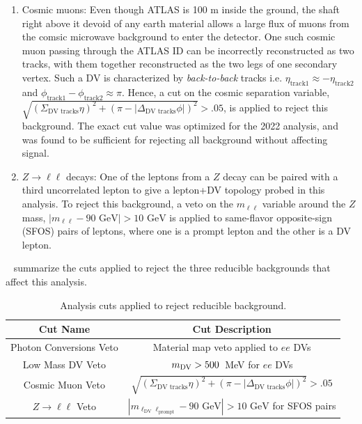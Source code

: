 \begin{enumerate}
    \item Cosmic muons: Even though ATLAS is 100 m inside the ground, the shaft right above it devoid of any earth material allows a large flux of muons from the comsic microwave background to enter the detector. One such cosmic muon passing through the ATLAS ID can be incorrectly reconstructed as two tracks, with them together reconstructed as the two legs of one secondary vertex. Such a DV is characterized by \textit{back-to-back} tracks i.e. $\eta_\mathrm{track1}\approx-\eta_\mathrm{track2}$ and $\phi_\mathrm{track1}-\phi_\mathrm{track2}\approx\pi$. Hence, a cut on the cosmic separation variable, $\sqrt{(\Sigma_\text{DV tracks}\eta)^2+(\pi-|\Delta_\text{DV tracks}\phi|)^2}>.05$, is applied to reject this background. The exact cut value was optimized for the 2022 analysis, and was found to be sufficient for rejecting all background without affecting signal.

    \item $Z\to\ell\ell$ decays: One of the leptons from a $Z$ decay can be paired with a third uncorrelated lepton to give a lepton+DV topology probed in this analysis. To reject this background, a veto on the $m_{\ell\ell}$ variable around the $Z$ mass, $|m_{\ell\ell}-90\text{ GeV}|>10\text{ GeV}$ is applied to same-flavor opposite-sign (SFOS) pairs of leptons, where one is a prompt lepton and the other is a DV lepton.
\end{enumerate}

~ summarize the cuts applied to reject the three reducible backgrounds that affect this analysis.

\begin{table}[!ht]
    \centering
    \begin{tabular}{cc}
        \hline\hline
         Cut Name & Cut Description\\
         \hline
         Photon Conversions Veto & Material map veto applied to $ee$ DVs\\
         Low Mass DV Veto & $m_{\mathrm{DV}}>500$~MeV for $ee$ DVs\\
         Cosmic Muon Veto & $\sqrt{(\Sigma_\text{DV tracks}\eta)^2+(\pi-|\Delta_\text{DV tracks}\phi|)^2}>.05$\\
         $Z\to\ell\ell$ Veto & $|m_{\ell_\mathrm{DV}\ell_\mathrm{prompt}}-90\text{ GeV}|>10\text{ GeV}$ for SFOS pairs \\
         \hline\hline
    \end{tabular}
    \caption{Analysis cuts applied to reject reducible background.}
    \label{tab:cuts_reducible}
\end{table}

